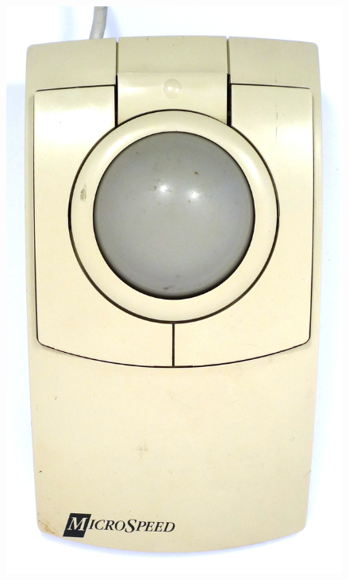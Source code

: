 \documentclass[11pt, a4paper]{article}
\begin{document}
\begin{figure}[h]
    \centering
    \includegraphics[scale=0.45]{1991_microspeed_pc-track/top_60.jpg}

\end{figure}
\end{document}
